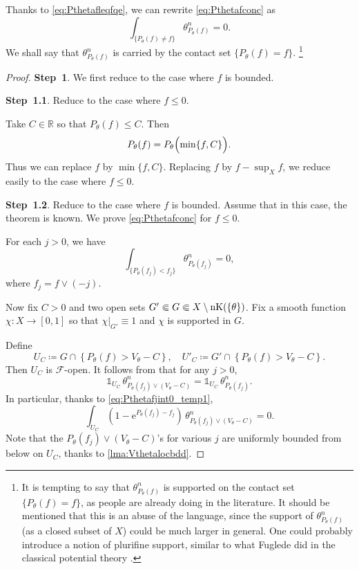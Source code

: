 Thanks to \eqref{eq:Pthetafleqfqe}, we can rewrite \eqref{eq:Pthetafconc} as
\[
\int_{\{P_{\theta}(f)\neq f\}} \theta_{P_{\theta}(f)}^n=0.
\]
We shall say that $\theta_{P_{\theta}(f)}^n$ is carried by the contact set $\{P_{\theta}(f)=f\}$.
\footnote{It is tempting to say that $\theta_{P_{\theta}(f)}^n$ is supported on the contact set $\{P_{\theta}(f)=f\}$, as people are already doing in the literature. It should be mentioned that this is an abuse of the language, since the support of $\theta_{P_{\theta}(f)}^n$ (as a closed subset of $X$) could be much larger in general. One could probably introduce a notion of plurifine support, similar to what Fuglede did in the classical potential theory \cite{Fug72}.}


\begin{proof}
    \textbf{Step~1}. We first reduce to the case where $f$ is bounded.

    \textbf{Step~1.1}. Reduce to the case where $f\leq 0$.

    Take $C\in \mathbb{R}$ so that $P_{\theta}(f)\leq C$. Then
    \[
    P_{\theta}(f)=P_{\theta}\Bigl( \min\{f,C\} \Bigr).
    \]
    Thus we can replace $f$ by $\min \{f,C\}$. Replacing $f$ by $f-\sup_X f$, we reduce easily to the case where $f\leq 0$.

    \textbf{Step~1.2}. Reduce to the case where $f$ is bounded. Assume that in this case, the theorem is known. We prove \eqref{eq:Pthetafconc} for $f\leq 0$.

    For each $j>0$, we have
    \begin{equation}\label{eq:Pthetafjint0_temp1}
    \int_{\{P_{\theta}(f_j)<f_j\}} \theta_{P_{\theta}(f_j)}^n=0,
    \end{equation}
    where $f_j=f\lor (-j)$.

    Now fix $C>0$ and two open sets $G'\Subset G\Subset X\setminus \operatorname{nK}(\{\theta\})$. Fix a smooth function $\chi\colon X\rightarrow [0,1]$ so that $\chi|_{G'}\equiv 1$ and $\chi$ is supported in $G$.

    Define
    \[
    U_C\coloneqq G \cap \left\{P_{\theta}(f)>V_{\theta}-C \right\},\quad U'_C\coloneqq G' \cap \left\{P_{\theta}(f)>V_{\theta}-C \right\}.
    \]
    Then $U_C$ is $\mathcal{F}$-open. It follows from  that for any $j>0$,
    \[
    \mathds{1}_{U_C}\, \theta_{P_{\theta}(f_j)\lor (V_{\theta}-C)}^n=\mathds{1}_{U_C}\, \theta_{P_{\theta}(f_j)}^n.
    \]
    In particular, thanks to \eqref{eq:Pthetafjint0_temp1},
    \begin{equation}\label{eq:intU1mexpPthetaf_temp1}
    \int_{U_C} \left( 1-\mathrm{e}^{P_{\theta}(f_j)-f_j} \right)\,\theta_{P_{\theta}(f_j)\lor (V_{\theta}-C)}^n=0.
    \end{equation}
    Note that the $P_{\theta}(f_j)\lor (V_{\theta}-C)$'s for various $j$ are uniformly bounded from below on $U_C$, thanks to \cref{lma:Vthetalocbdd}.


\end{proof}
